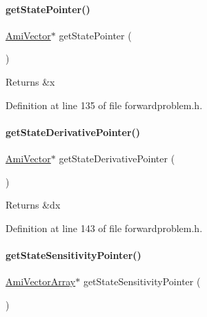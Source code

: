 \paragraph{\texorpdfstring{getStatePointer()}{getStatePointer()}}
{\footnotesize\ttfamily \mbox{\hyperlink{classamici_1_1_ami_vector}{Ami\+Vector}}$\ast$ get\+State\+Pointer (\begin{DoxyParamCaption}{ }\end{DoxyParamCaption})}

\begin{DoxyReturn}{Returns}
\&x 
\end{DoxyReturn}


Definition at line 135 of file forwardproblem.\+h.

\mbox{\label{classamici_1_1_forward_problem_a096d23f8405c903ca5d5d4efec5facc0}} 
\paragraph{\texorpdfstring{getStateDerivativePointer()}{getStateDerivativePointer()}}
{\footnotesize\ttfamily \mbox{\hyperlink{classamici_1_1_ami_vector}{Ami\+Vector}}$\ast$ get\+State\+Derivative\+Pointer (\begin{DoxyParamCaption}{ }\end{DoxyParamCaption})}

\begin{DoxyReturn}{Returns}
\&dx 
\end{DoxyReturn}


Definition at line 143 of file forwardproblem.\+h.

\mbox{\label{classamici_1_1_forward_problem_a5ef9198bc0b08dc9e67efcd5dcf64ced}} 
\paragraph{\texorpdfstring{getStateSensitivityPointer()}{getStateSensitivityPointer()}}
{\footnotesize\ttfamily \mbox{\hyperlink{classamici_1_1_ami_vector_array}{Ami\+Vector\+Array}}$\ast$ get\+State\+Sensitivity\+Pointer (\begin{DoxyParamCaption}{ }\end{DoxyParamCaption})}

